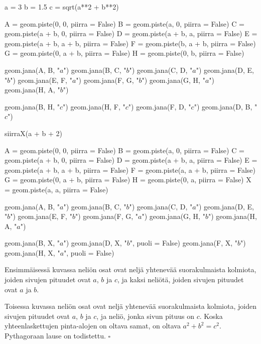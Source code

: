 \begin{kuva}
a = 3
b = 1.5
c = sqrt(a**2 + b**2)

A = geom.piste(0, 0, piirra = False)
B = geom.piste(a, 0, piirra = False)
C = geom.piste(a + b, 0, piirra = False)
D = geom.piste(a + b, a, piirra = False)
E = geom.piste(a + b, a + b, piirra = False)
F = geom.piste(b, a + b, piirra = False)
G = geom.piste(0, a + b, piirra = False)
H = geom.piste(0, b, piirra = False)

geom.jana(A, B, "$a$")
geom.jana(B, C, "$b$")
geom.jana(C, D, "$a$")
geom.jana(D, E, "$b$")
geom.jana(E, F, "$a$")
geom.jana(F, G, "$b$")
geom.jana(G, H, "$a$")
geom.jana(H, A, "$b$")

geom.jana(B, H, "$c$")
geom.jana(H, F, "$c$")
geom.jana(F, D, "$c$")
geom.jana(D, B, "$c$")

siirraX(a + b + 2)

A = geom.piste(0, 0, piirra = False)
B = geom.piste(a, 0, piirra = False)
C = geom.piste(a + b, 0, piirra = False)
D = geom.piste(a + b, a, piirra = False)
E = geom.piste(a + b, a + b, piirra = False)
F = geom.piste(a, a + b, piirra = False)
G = geom.piste(0, a + b, piirra = False)
H = geom.piste(0, a, piirra = False)
X = geom.piste(a, a, piirra = False)

geom.jana(A, B, "$a$")
geom.jana(B, C, "$b$")
geom.jana(C, D, "$a$")
geom.jana(D, E, "$b$")
geom.jana(E, F, "$b$")
geom.jana(F, G, "$a$")
geom.jana(G, H, "$b$")
geom.jana(H, A, "$a$")

geom.jana(B, X, "$a$")
geom.jana(D, X, "$b$", puoli = False)
geom.jana(F, X, "$b$")
geom.jana(H, X, "$a$", puoli = False)
\end{kuva}

Ensimmäisessä kuvassa neliön osat ovat neljä yhtenevää suorakulmaista kolmiota, joiden
sivujen pituudet ovat $a$, $b$ ja $c$, ja kaksi neliötä, joiden sivujen pituudet ovat $a$ ja
$b$.

Toisessa kuvassa neliön osat ovat neljä yhtenevää suorakulmaista kolmiota, joiden
sivujen pituudet ovat $a$, $b$ ja $c$, ja neliö, jonka sivun pituus on $c$.
Koska yhteenlaskettujen pinta-alojen on oltava samat, on oltava $a^2 + b^2 = c^2$.
Pythagoraan lause on todistettu. $\square $

